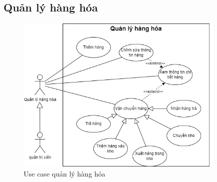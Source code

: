 \subsection{Quản lý hàng hóa}
\begin{figure}[!htp]
    \centering
    \includegraphics[width=10cm]{img/UseCase/UseCase-Quản lý hàng.drawio.png}
    \newline
    \caption{Use case quản lý hàng hóa}
\end{figure}


